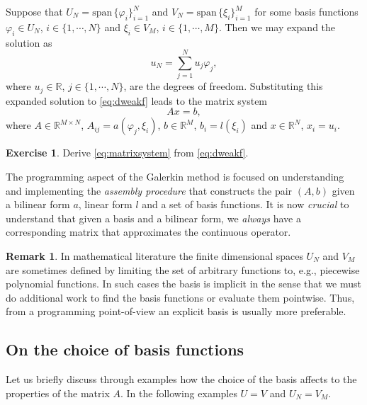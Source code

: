 \documentclass{amsart}
\theoremstyle{definition}
\newtheorem{remark}{Remark}
\newtheorem{exercise}{\color{red}Exercise}
\begin{document}
Suppose that $U_N = \mathrm{span}\,\{\varphi_i\}_{i=1}^N$ and $V_N =
\mathrm{span}\,\{\xi_i\}_{i=1}^M$ for some basis functions $\varphi_i
\in U_N$, $i\in\{1,\cdots,N\}$ and $\xi_i \in V_M$,
$i\in\{1,\cdots,M\}$.
Then we may expand the solution as
\begin{equation}
  u_N = \sum_{j=1}^N u_j \varphi_j,
\end{equation}
where $u_j \in \mathbb{R}$, $j\in\{1,\cdots,N\}$, are the degrees of
freedom. Substituting this expanded solution to \eqref{eq:dweakf}
leads to the matrix system
\begin{equation}
  \label{eq:matrixsystem}
  A x = b,
\end{equation}
where $A \in \mathbb{R}^{M \times N}$, $A_{ij} = a(\varphi_j, \xi_i)$, $b \in \mathbb{R}^M$, $b_i = l(\xi_i)$ and $x \in \mathbb{R}^N$, $x_i = u_i$.

\begin{exercise}
  Derive \eqref{eq:matrixsystem} from \eqref{eq:dweakf}.
\end{exercise}

The programming aspect of the Galerkin method is focused on
understanding and implementing the \emph{assembly procedure} that
constructs the pair $(A,b)$ given a bilinear form $a$, linear form $l$
and a set of basis functions. It is now \emph{crucial} to understand
that given a basis and a bilinear form, we \emph{always} have a corresponding
matrix that approximates the continuous operator.

\begin{remark}
    In mathematical literature the finite dimensional spaces $U_N$ and
$V_M$ are sometimes defined by limiting the set of arbitrary functions
to, e.g., piecewise polynomial functions. In such cases the basis is
implicit in the sense that we must do additional work to find the
basis functions or evaluate them pointwise.  Thus, from a programming
point-of-view an explicit basis is usually more preferable.
\end{remark}

\subsection{On the choice of basis functions}

Let us briefly discuss through examples how the choice of the basis
affects to the properties of the matrix $A$. In the following examples
$U=V$ and $U_N = V_M$.
\end{document}
